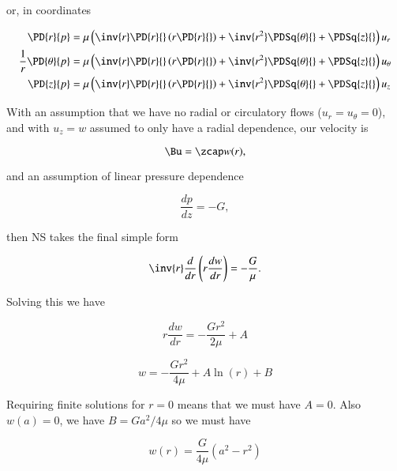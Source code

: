 or, in coordinates

\begin{align}\label{eqn:continuumL12:690}
\PD{r}{p}  
&= \mu \left(
\inv{r} \PD{r}{} \left( r \PD{r}{} \right) + \inv{r^2} \PDSq{\theta}{} + \PDSq{z}{} \right)
u_r \\
\frac{1}{r} \PD{\theta}{p}
&= \mu \left(
\inv{r} \PD{r}{} \left( r \PD{r}{} \right) + \inv{r^2} \PDSq{\theta}{} + \PDSq{z}{} \right)
u_\theta \\
\PD{z}{p}
&= \mu \left(
\inv{r} \PD{r}{} \left( r \PD{r}{} \right) + \inv{r^2} \PDSq{\theta}{} + \PDSq{z}{} \right)
u_z
\end{align}

With an assumption that we have no radial or circulatory flows ($u_r = u_\theta = 0$), and with $u_z = w$ assumed to only have a radial dependence, our velocity is

\begin{equation}\label{eqn:continuumL12:50}
\Bu = \zcap w(r),
\end{equation}

and an assumption of linear pressure dependence

\begin{equation}\label{eqn:continuumL12:60}
\frac{dp}{dz} = -G,
\end{equation}

then NS takes the final simple form

\begin{equation}\label{eqn:continuumL12:70}
\inv{r} \frac{d}{dr} \left( r \frac{dw}{dr} \right) = - \frac{G}{\mu}.
\end{equation}

Solving this we have

\begin{equation}\label{eqn:continuumL12:90}
r \frac{dw}{dr} = - \frac{G r^2}{2\mu} + A
\end{equation}

\begin{equation}\label{eqn:continuumL12:110}
w = -\frac{G r^2}{4 \mu} + A \ln(r) + B
\end{equation}

Requiring finite solutions for $r = 0$ means that we must have $A = 0$.  Also $w(a) = 0$, we have $B = G a^2/4 \mu$ so we must have

\begin{equation}\label{eqn:continuumL12:130}
w(r) = \frac{G}{4 \mu}( a^2 - r^2 )
\end{equation}

